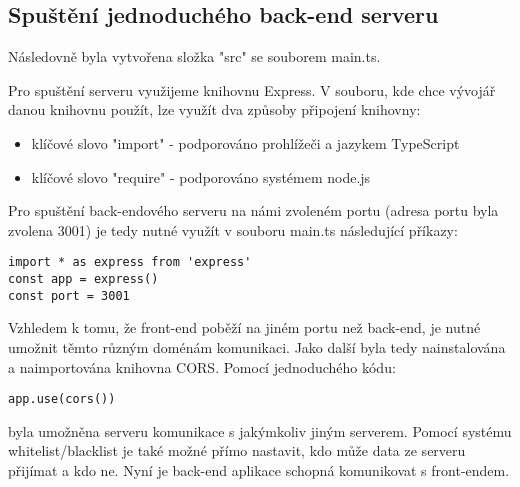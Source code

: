 \subsection{Spuštění jednoduchého back-end serveru}
Následovně byla vytvořena složka "src" se souborem main.ts.

Pro spuštění serveru využijeme knihovnu Express. V souboru, kde chce vývojář danou knihovnu použít, lze využít dva způsoby připojení knihovny:
\begin{itemize}
\item klíčové slovo "import" - podporováno prohlížeči a jazykem TypeScript
\item klíčové slovo "require" - podporováno systémem node.js
\end{itemize}


Pro spuštění back-endového serveru na námi zvoleném portu (adresa portu byla zvolena 3001) je tedy nutné využít v souboru main.ts následující příkazy:
\begin{lstlisting}
import * as express from 'express'
const app = express()
const port = 3001
\end{lstlisting}
Vzhledem k tomu, že front-end poběží na jiném portu než back-end, je nutné umožnit těmto různým doménám komunikaci. Jako další byla tedy nainstalována a naimportována knihovna CORS. Pomocí jednoduchého kódu:
\begin{lstlisting}
app.use(cors())
\end{lstlisting}
byla umožněna serveru komunikace s jakýmkoliv jiným serverem. Pomocí systému whitelist/blacklist je také možné přímo nastavit, kdo může data ze serveru přijímat a kdo ne. Nyní je back-end aplikace schopná komunikovat s front-endem.

